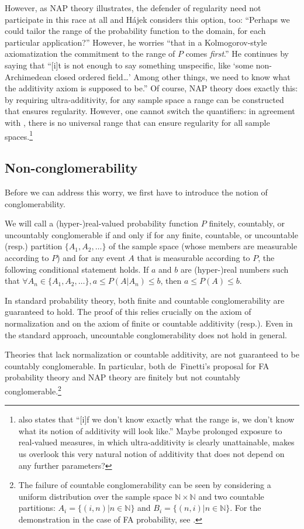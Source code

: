 However, as NAP theory illustrates, the defender of regularity need not participate in this race at all and H\'{a}jek considers this option, too: ``Perhaps we could tailor the range of the probability function to the domain, for each particular application?'' However, he worries ``that in a Kolmogorov-style axiomatization the commitment to the range of $P$ comes \emph{first}.'' He continues by saying that ``[i]t is not enough to say something unspecific, like `some non-Archimedean closed ordered field\ldots' Among other things, we need to know
what the additivity axiom is supposed to be.'' Of course, NAP theory does exactly this: by requiring ultra-additivity, for any  sample space a range can be constructed that ensures regularity. However, one cannot switch the quantifiers: in agreement with \citet{Pruss:2013}, there is no universal range that can ensure regularity for all sample spaces.\footnote{\citet{Hajek:2012b} also states that ``[i]f we don't know exactly what the range is, we don't know what its notion of additivity will look like.'' Maybe prolonged exposure to real-valued measures, in which ultra-additivity is clearly unattainable, makes us overlook this very natural notion of additivity that does not depend on any further parameters?}

\subsection{Non-conglomerability}
Before we can address this worry, we first have to introduce the notion of conglomerability.

We will call a (hyper-)real-valued probability function $P$ finitely, countably, or uncountably conglomerable if and only if for any finite, countable, or uncountable (resp.) partition $\{A_1, A_2, \ldots \}$ of the sample space (whose members are measurable according to $P$) and for any event $A$ that is measurable according to $P$, the following conditional statement holds. If $a$ and $b$ are (hyper-)real numbers such that $\forall A_n \in \{A_1, A_2, \ldots \}, a \leq P(A|A_n) \leq b$, then $a \leq P(A) \leq b$.

In standard probability theory, both finite and countable conglomerability are guaranteed to hold. The proof of this relies crucially on the axiom of normalization and on the axiom of finite or countable additivity (resp.). Even in the standard approach, uncountable conglomerability does not hold in general.

Theories that lack normalization or countable additivity, are not guaranteed to be countably conglomerable. In particular, both de~Finetti's proposal for FA probability theory and NAP theory are finitely but not countably conglomerable.\footnote{The failure of countable conglomerability can be seen by considering a uniform distribution over the sample space $\mathbb{N}\times\mathbb{N}$ and two countable partitions: $A_i = \{(i,n) | n\in \mathbb{N} \}$ and $B_i=\{(n,i) | n \in \mathbb{N} \}$. For the demonstration in the case of FA probability, see \citet[Ch.~5]{deFinetti:1972}.}

